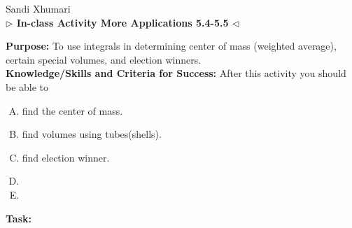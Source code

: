 \documentclass[answers]{exam}
\begin{document}
\begin{center}
	\hfill Sandi Xhumari \\ \textbf{$\triangleright$ In-class Activity More Applications 5.4-5.5 $\triangleleft$}\\
\end{center}

\textbf{Purpose:} To use integrals in determining center of mass (weighted average), certain special volumes, and election winners.     \\

\textbf{Knowledge/Skills and Criteria for Success:} After this activity you should be able to

\begin{enumerate}[A.]
	\item find the center of mass.
	\item find volumes using tubes(shells).
	\item find election winner.
	\item 
	\item
	
	
\end{enumerate}

\textbf{Task:} 
\end{document}
